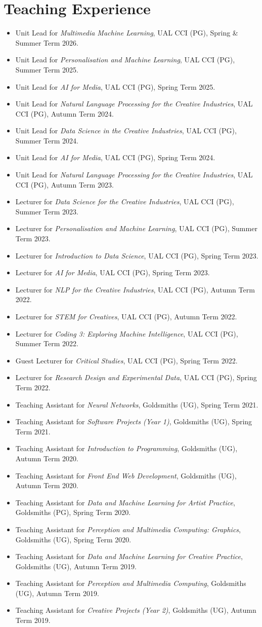 \documentclass[letterpaper,11pt]{article}
\newcommand{\resumeItem}[2]{
  \item\small{
    \textbf{#1}{ #2 \vspace{-2pt}}
  }
}
\newcommand{\resumeSubItem}[2]{\resumeItem{#1}{#2}\vspace{-4pt}}
\newcommand{\resumeSubHeadingListStart}{\begin{itemize}[leftmargin=*]}
\newcommand{\resumeSubHeadingListEnd}{\end{itemize}}
\begin{document}
\section{Teaching Experience}
 \resumeSubHeadingListStart
  \resumeSubItem{}{Unit Lead for \textit{Multimedia Machine Learning}, UAL CCI (PG), Spring \& Summer Term 2026.}
  \resumeSubItem{}{Unit Lead for \textit{Personalisation and Machine Learning}, UAL CCI (PG), Summer Term 2025.}
  \resumeSubItem{}{Unit Lead for \textit{AI for Media}, UAL CCI (PG), Spring Term 2025.}
  \resumeSubItem{}{Unit Lead for \textit{Natural Language Processing for the Creative Industries}, UAL CCI (PG), Autumn Term 2024.}
  \resumeSubItem{}{Unit Lead for \textit{Data Science in the Creative Industries}, UAL CCI (PG), Summer Term 2024.}
  \resumeSubItem{}{Unit Lead for \textit{AI for Media}, UAL CCI (PG), Spring Term 2024.}
  \resumeSubItem{}{Unit Lead for \textit{Natural Language Processing for the Creative Industries}, UAL CCI (PG), Autumn Term 2023.}
  \resumeSubItem{}{Lecturer for \textit{Data Science for the Creative Industries}, UAL CCI (PG), Summer Term 2023.}
  \resumeSubItem{}{Lecturer for \textit{Personalisation and Machine Learning}, UAL CCI (PG), Summer Term 2023.}
  \resumeSubItem{}{Lecturer for \textit{Introduction to Data Science}, UAL CCI (PG), Spring Term 2023.}
  \resumeSubItem{}{Lecturer for \textit{AI for Media}, UAL CCI (PG), Spring Term 2023.}
  \resumeSubItem{}{Lecturer for \textit{NLP for the Creative Industries}, UAL CCI (PG), Autumn Term 2022.}
  \resumeSubItem{}{Lecturer for \textit{STEM for Creatives}, UAL CCI (PG), Autumn Term 2022.}
  \resumeSubItem{}{Lecturer for \textit{Coding 3: Exploring Machine Intelligence}, UAL CCI (PG), Summer Term 2022.}
  \resumeSubItem{}{Guest Lecturer for \textit{Critical Studies}, UAL CCI (PG), Spring Term 2022.}
  \resumeSubItem{}{Lecturer for \textit{Research Design and Experimental Data}, UAL CCI (PG), Spring Term 2022.}
  \resumeSubItem{}{Teaching Assistant for \textit{Neural Networks}, Goldsmiths (UG), Spring Term 2021.}
  \resumeSubItem{}{Teaching Assistant for \textit{Software Projects (Year 1)}, Goldsmiths (UG), Spring Term 2021.}
  \resumeSubItem{}{Teaching Assistant for \textit{Introduction to Programming}, Goldsmiths (UG), Autumn Term 2020.}
  \resumeSubItem{}{Teaching Assistant for \textit{Front End Web Development}, Goldsmiths (UG), Autumn Term 2020.}
  \resumeSubItem{}{Teaching Assistant for \textit{Data and Machine Learning for Artist Practice}, Goldsmiths (PG), Spring Term 2020.}
  \resumeSubItem{}{Teaching Assistant for \textit{Perception and Multimedia Computing: Graphics}, Goldsmiths (UG), Spring Term 2020.}
  \resumeSubItem{}{Teaching Assistant for \textit{Data and Machine Learning for Creative Practice}, Goldsmiths (UG), Autumn Term 2019.}
  \resumeSubItem{}{Teaching Assistant for \textit{Perception and Multimedia Computing}, Goldsmiths (UG), Autumn Term 2019.}
  \resumeSubItem{}{Teaching Assistant for \textit{Creative Projects (Year 2)}, Goldsmiths (UG), Autumn Term 2019.}
 \resumeSubHeadingListEnd
 
\end{document}
